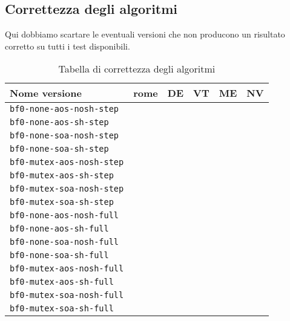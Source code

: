 \documentclass{article}
\begin{document}
	\subsection{Correttezza degli algoritmi}
	Qui dobbiamo scartare le eventuali versioni che non producono un risultato corretto su tutti i test disponibili.
	\begin{table}[!ht]
		\centering
		\begin{tabular}{|l|c|c|c|c|c|}
			\hline
			\textbf{Nome versione} & \textbf{rome} & \textbf{DE} & \textbf{VT} & \textbf{ME} & \textbf{NV} \\ \hline
			\texttt{bf0-none-aos-nosh-step}  &  &  &  &  &  \\ \hline
			\texttt{bf0-none-aos-sh-step}    &  &  &  &  &  \\ \hline
			\texttt{bf0-none-soa-nosh-step}  &  &  &  &  &  \\ \hline
			\texttt{bf0-none-soa-sh-step}    &  &  &  &  &  \\ \hline
			\texttt{bf0-mutex-aos-nosh-step} &  &  &  &  &  \\ \hline
			\texttt{bf0-mutex-aos-sh-step}   &  &  &  &  &  \\ \hline
			\texttt{bf0-mutex-soa-nosh-step} &  &  &  &  &  \\ \hline
			\texttt{bf0-mutex-soa-sh-step}   &  &  &  &  &  \\ \hline
			\texttt{bf0-none-aos-nosh-full}  &  &  &  &  &  \\ \hline
			\texttt{bf0-none-aos-sh-full}    &  &  &  &  &  \\ \hline
			\texttt{bf0-none-soa-nosh-full}  &  &  &  &  &  \\ \hline
			\texttt{bf0-none-soa-sh-full}    &  &  &  &  &  \\ \hline
			\texttt{bf0-mutex-aos-nosh-full} &  &  &  &  &  \\ \hline
			\texttt{bf0-mutex-aos-sh-full}   &  &  &  &  &  \\ \hline
			\texttt{bf0-mutex-soa-nosh-full} &  &  &  &  &  \\ \hline
			\texttt{bf0-mutex-soa-sh-full}   &  &  &  &  &  \\ \hline
		\end{tabular}
		\label{tab:correttezza}
		\caption{Tabella di correttezza degli algoritmi}
	\end{table}
	
\end{document}
